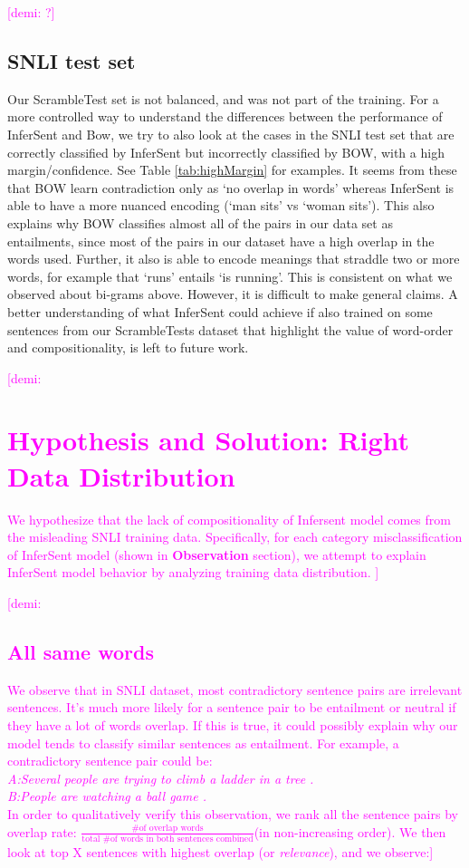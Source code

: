 \documentclass[10pt,letterpaper]{article}
\newcommand{\demi}[1]{\textcolor{magenta}{[demi: #1]}}
\begin{document}
\demi{?} 
\subsection{SNLI test set}

Our ScrambleTest set is not balanced, and was not part of the training. For a more controlled way to understand the differences between the performance of InferSent and Bow, we try to also look at the cases in the SNLI test set that are correctly classified by InferSent but incorrectly classified by BOW, with a high margin/confidence. See Table \ref{tab:highMargin} for examples. It seems from these that BOW learn contradiction only as `no overlap in words' whereas InferSent is able to have a more nuanced encoding (`man sits' vs `woman sits'). This also explains why BOW classifies almost all of the pairs in our data set as entailments, since most of the pairs in our dataset have a high overlap in the words used. Further, it also is able to encode meanings that straddle two or more words, for example that `runs' entails `is running'. This is consistent on what we observed about bi-grams above. However, it is difficult to make general claims. A better understanding of what InferSent could achieve if also trained on some sentences from our ScrambleTests dataset that highlight the value of word-order and compositionality, is left to future work.

\demi{
\section{Hypothesis and Solution: Right Data Distribution}
We hypothesize that the lack of compositionality of Infersent model comes from the misleading SNLI training data. Specifically, for each category misclassification of InferSent model (shown in \textbf{Observation} section), we attempt to explain InferSent model behavior by analyzing training data distribution.
}

\demi{
\subsection{All same words}
We observe that in SNLI dataset, most contradictory sentence pairs are irrelevant sentences. It's much more likely for a sentence pair to be entailment or neutral if they have a lot of words overlap. If this is true, it could possibly explain why our model tends to classify similar sentences as entailment. For example, a contradictory sentence pair could be:\\
\textit{A:Several people are trying to climb a ladder in a tree .}\\
\textit{B:People are watching a ball game .}\\
In order to qualitatively verify this observation, we rank all the sentence pairs by overlap rate: $\frac{\text{\# of overlap words}}{\text{total \# of words in both sentences combined}}$(in non-increasing order). We then look at top X sentences with highest overlap (or \textit{relevance}), and we observe:}
\end{document}
